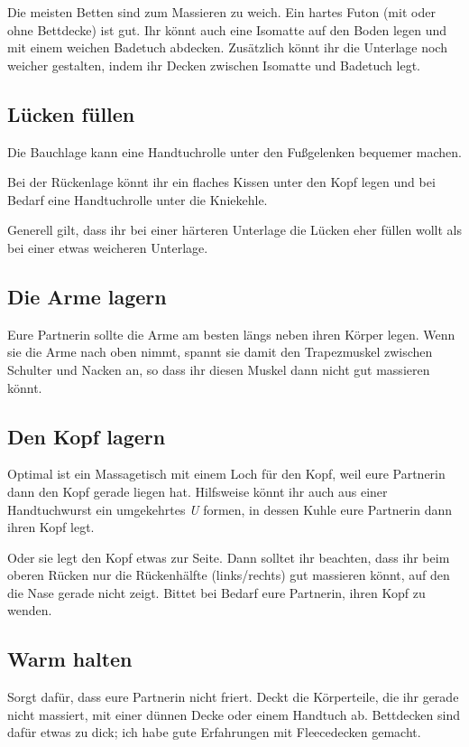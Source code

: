 Die meisten Betten sind zum Massieren zu weich. Ein hartes Futon (mit oder ohne Bettdecke) ist gut. Ihr könnt auch eine Isomatte auf den Boden legen und mit einem weichen Badetuch abdecken. Zusätzlich könnt ihr die Unterlage noch weicher gestalten, indem ihr Decken zwischen Isomatte und Badetuch legt.


\subsection{Lücken füllen}

Die Bauchlage kann eine Handtuchrolle unter den Fußgelenken bequemer machen.

Bei der Rückenlage könnt ihr ein flaches Kissen unter den Kopf legen und bei Bedarf eine Handtuchrolle unter die Kniekehle.

Generell gilt, dass ihr bei einer härteren Unterlage die Lücken eher füllen wollt als bei einer etwas weicheren Unterlage.


\subsection{Die Arme lagern}

Eure Partnerin sollte die Arme am besten längs neben ihren Körper legen. Wenn sie die Arme nach oben nimmt, spannt sie damit den Trapezmuskel zwischen Schulter und Nacken an, so dass ihr diesen Muskel dann nicht gut massieren könnt.


\subsection{Den Kopf lagern}

Optimal ist ein Massagetisch mit einem Loch für den Kopf, weil eure Partnerin dann den Kopf gerade liegen hat. Hilfsweise könnt ihr auch aus einer Handtuchwurst ein umgekehrtes \emph{U} formen, in dessen Kuhle eure Partnerin dann ihren Kopf legt.

Oder sie legt den Kopf etwas zur Seite. Dann solltet ihr beachten, dass ihr beim oberen Rücken nur die Rückenhälfte (links/rechts) gut massieren könnt, auf den die Nase gerade nicht zeigt. Bittet bei Bedarf eure Partnerin, ihren Kopf zu wenden.


\subsection{Warm halten}

Sorgt dafür, dass eure Partnerin nicht friert. Deckt die Körperteile, die ihr gerade nicht massiert, mit einer dünnen Decke oder einem Handtuch ab. Bettdecken sind dafür etwas zu dick; ich habe gute Erfahrungen mit Fleecedecken gemacht.


